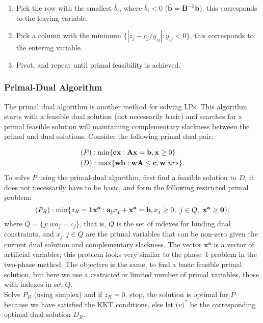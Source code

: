 \begin{enumerate}
\item Pick the row with the smallest $\bar{b}_i$, where $\bar{b}_i < 0$ ($\mathbf{\bar{b}} = \mathbf{B^{-1}b}$), this corresponds to the leaving variable.
\item Pick a column with the minimum $\{|z_j -c_j/y_{ij}|:y_{ij} < 0\}$, this corresponds to the entering variable.
\item Pivot, and repeat until primal feasibility is achieved.
\end{enumerate}



\subsubsection{Primal-Dual Algorithm}
The primal dual algorithm is another method for solving LPs. This algorithm starts with a feasible dual solution (not necessarily basic) and searches for a primal feasible solution will maintaining complementary slackness between the primal and dual solutions.  Consider the following primal dual pair:

\begin{align*}
&(P):\min\{\mathbf{cx}: \mathbf{Ax} = \mathbf{b}, \mathbf{x} \ge 0\} \\
&(D):\max\{{\bf wb}: \mathbf{wA} \le \mathbf{c}, {\bf w}~urs\}.
\end{align*}
To solve $P$ using the primal-dual algorithm, first find a feasible solution to $D$, it does not necessarily have to be basic, and form the following restricted primal problem:
$$(P_R):\min\{z_R= {\bf 1x^a}: \mathbf{a_j}x_j+\mathbf{x^a\mathbf} = \mathbf{b}, x_j \ge 0,~ j \in Q,~\mathbf{x^a} \ge \mathbf{0}\},$$
where $Q=\{j:wa_j = c_j\}$, that is, $Q$ is the set of indexes for binding dual constraints, and $x_j, j \in Q$ are the primal variables that can be non-zero given the current dual solution and complementary slackness. The vector $\mathbf{x^a}$ is a vector of artificial variables; this problem looks very similar to the phase~1 problem in the two-phase method.  The objective is the same, to find a basic feasible primal solution, but here we use a {\it restricted} or limited number of primal variables, those with indexes in set $Q$.\\

Solve $P_R$ (using simplex) and if $z_R=0$, stop, the solution is optimal for $P$ because we have satisfied the KKT conditions, else let $\mathbf(v)^*$ be the corresponding optimal dual solution $D_R$.

